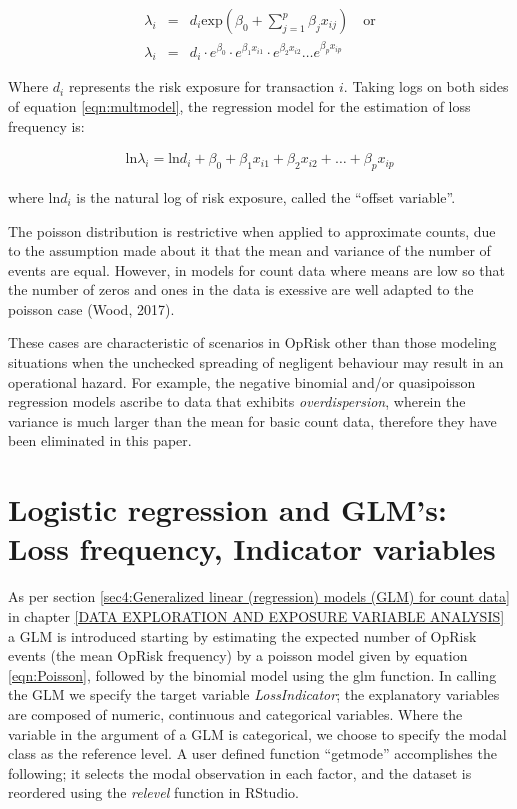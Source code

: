 \documentclass{DissertateUSU}
\begin{document}
\singlespacing

\begin{eqnarray}\label{eqn:multmodel}
\lambda_i &=& d_i\mbox{exp}(\beta_0 + \sum_{j=1}^{p}\beta_jx_{ij}) \quad \mbox{or} \nonumber \\
\lambda_i &=& d_i\cdot e^{\beta_0}\cdot e^{\beta_1x_{i1}}\cdot e^{\beta_2x_{i2}} \ldots e^{\beta_px_{ip}}
\end{eqnarray} \doublespacing

Where \(d_i\) represents the risk exposure for transaction \(i\). Taking
logs on both sides of equation \ref{eqn:multmodel}, the regression model
for the estimation of loss frequency is:

\singlespacing

\begin{eqnarray}
\mbox{ln}\lambda_i =  \mbox{ln}d_i + \beta_0 + \beta_1x_{i1} + \beta_2x_{i2} + \ldots + \beta_px_{ip}
\end{eqnarray} \doublespacing

where \(\mbox{ln}d_i\) is the natural log of risk exposure, called the
``offset variable''.\medskip

The poisson distribution is restrictive when applied to approximate
counts, due to the assumption made about it that the mean and variance
of the number of events are equal. However, in models for count data
where means are low so that the number of zeros and ones in the data is
exessive are well adapted to the poisson case (Wood, 2017).\medskip

These cases are characteristic of scenarios in OpRisk other than those
modeling situations when the unchecked spreading of negligent behaviour
may result in an operational hazard. For example, the negative binomial
and/or quasipoisson regression models ascribe to data that exhibits
\emph{overdispersion}, wherein the variance is much larger than the mean
for basic count data, therefore they have been eliminated in this paper.

\section{Logistic regression and GLM's: Loss frequency, Indicator variables}
\label{sec:Logistic regression and regression GLM's: Loss frequency, Indicator variables}

As per section
\ref{sec4:Generalized linear (regression) models (GLM) for count data}
in chapter \ref{DATA EXPLORATION AND EXPOSURE VARIABLE ANALYSIS} a GLM
is introduced starting by estimating the expected number of OpRisk
events (the mean OpRisk frequency) by a poisson model given by equation
\ref{eqn:Poisson}, followed by the binomial model using the glm
function. In calling the GLM we specify the target variable
\emph{LossIndicator}; the explanatory variables are composed of numeric,
continuous and categorical variables. Where the variable in the argument
of a GLM is categorical, we choose to specify the modal class as the
reference level. A user defined function ``getmode'' accomplishes the
following; it selects the modal observation in each factor, and the
dataset is reordered using the \emph{relevel} function in RStudio.
\end{document}
